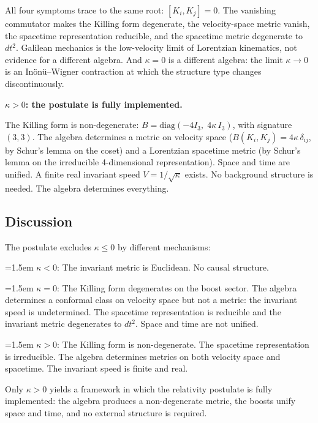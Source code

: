 \documentclass[11pt]{article}
\begin{document}
All four symptoms trace to the same root: $[K_i,K_j] = 0$. The vanishing commutator makes the Killing form degenerate, the velocity-space metric vanish, the spacetime representation reducible, and the spacetime metric degenerate to $dt^2$. Galilean mechanics is the low-velocity limit of Lorentzian kinematics, not evidence for a different algebra. And $\kappa = 0$ is a different algebra: the limit $\kappa \to 0$ is an In\"on\"u--Wigner contraction at which the structure type changes discontinuously.

\bigskip
\textbf{$\kappa > 0$: the postulate is fully implemented.}

\smallskip
The Killing form is non-degenerate: $B = \mathrm{diag}(-4I_3,\;4\kappa\,I_3)$, with signature $(3,3)$. The algebra determines a metric on velocity space ($B(K_i,K_j) = 4\kappa\,\delta_{ij}$, by Schur's lemma on the coset) and a Lorentzian spacetime metric (by Schur's lemma on the irreducible 4-dimensional representation). Space and time are unified. A finite real invariant speed $V = 1/\sqrt{\kappa}$ exists. No background structure is needed. The algebra determines everything.


\subsection*{Discussion}

The postulate excludes $\kappa \leq 0$ by different mechanisms:

\smallskip
\hangindent=1.5em\noindent
$\kappa < 0$:\; The invariant metric is Euclidean. No causal structure.

\smallskip
\hangindent=1.5em\noindent
$\kappa = 0$:\; The Killing form degenerates on the boost sector. The algebra determines a conformal class on velocity space but not a metric: the invariant speed is undetermined. The spacetime representation is reducible and the invariant metric degenerates to $dt^2$. Space and time are not unified.

\smallskip
\hangindent=1.5em\noindent
$\kappa > 0$:\; The Killing form is non-degenerate. The spacetime representation is irreducible. The algebra determines metrics on both velocity space and spacetime. The invariant speed is finite and real.

\medskip
Only $\kappa > 0$ yields a framework in which the relativity postulate is fully implemented: the algebra produces a non-degenerate metric, the boosts unify space and time, and no external structure is required.
\end{document}
